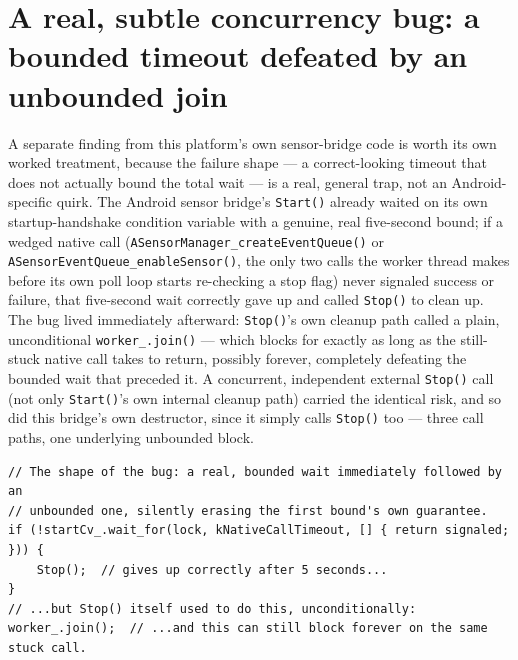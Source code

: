 \section{A real, subtle concurrency bug: a bounded timeout defeated by an unbounded join}

A separate finding from this platform's own sensor-bridge code is worth its own worked
treatment, because the failure shape --- a correct-looking timeout that does not actually
bound the total wait --- is a real, general trap, not an Android-specific quirk. The Android
sensor bridge's \texttt{Start()} already waited on its own startup-handshake condition
variable with a genuine, real five-second bound; if a wedged native call
(\texttt{ASensorManager\_createEventQueue()} or \texttt{ASensorEventQueue\_enableSensor()}, the
only two calls the worker thread makes before its own poll loop starts re-checking a stop
flag) never signaled success or failure, that five-second wait correctly gave up and called
\texttt{Stop()} to clean up. The bug lived immediately afterward: \texttt{Stop()}'s own cleanup
path called a plain, unconditional \texttt{worker\_.join()} --- which blocks for exactly as
long as the still-stuck native call takes to return, possibly forever, completely defeating
the bounded wait that preceded it. A concurrent, independent external \texttt{Stop()} call (not
only \texttt{Start()}'s own internal cleanup path) carried the identical risk, and so did this
bridge's own destructor, since it simply calls \texttt{Stop()} too --- three call paths, one
underlying unbounded block.

\begin{lstlisting}
// The shape of the bug: a real, bounded wait immediately followed by an
// unbounded one, silently erasing the first bound's own guarantee.
if (!startCv_.wait_for(lock, kNativeCallTimeout, [] { return signaled; })) {
    Stop();  // gives up correctly after 5 seconds...
}
// ...but Stop() itself used to do this, unconditionally:
worker_.join();  // ...and this can still block forever on the same stuck call.
\end{lstlisting}


